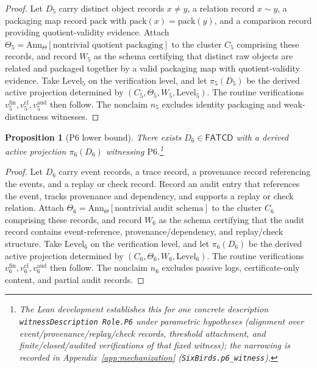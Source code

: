 \documentclass[11pt]{article}
\newtheorem{proposition}[theorem]{Proposition}
\theoremstyle{definition}
\newcommand{\FATCD}{\ensuremath{\mathsf{FATCD}}}
\newcommand{\Psix}{\ensuremath{\mathrm{P6}}}
\begin{document}
\begin{proof}
Let \(D_5\) carry distinct object records \(x \ne y\), a relation
record \(x \sim y\), a packaging map record
\(\mathrm{pack}\) with \(\mathrm{pack}(x) = \mathrm{pack}(y)\), and a
comparison record providing quotient-validity evidence. Attach
\(\Theta_5 = \mathrm{Ann}_\Theta[\text{nontrivial quotient packaging}]\)
to the cluster \(C_5\) comprising these records, and record \(W_5\) as
the schema certifying
that distinct raw objects are related and packaged together by a valid
packaging map with quotient-validity evidence. Take
\(\mathrm{Level}_5\) on the verification level, and let \(\pi_5(D_5)\)
be the derived active projection determined by
\((C_5,\Theta_5,W_5,\mathrm{Level}_5)\). The routine verifications
\(v_5^{\mathrm{fin}}, v_5^{\mathrm{cl}}, v_5^{\mathrm{aud}}\) then
follow. The nonclaim \(n_5\) excludes identity packaging and
weak-distinctness witnesses.
\end{proof}

\begin{proposition}[\Psix{} lower bound]\label{prop:p6-witness}
There exists \(D_6 \in \FATCD{}\) with a derived active projection
\(\pi_6(D_6)\) witnessing \Psix{}.\footnote{The Lean development establishes this for one concrete description \texttt{witnessDescription Role.P6} under parametric hypotheses (alignment over event/provenance/replay/check records, threshold attachment, and finite/closed/audited verifications of that fixed witness); the narrowing is recorded in Appendix~\ref{app:mechanization} (\texttt{SixBirds.p6\_witness}).}
\end{proposition}

\begin{proof}
Let \(D_6\) carry event records, a trace record, a provenance record
referencing the events, and a replay or check record. Record an audit
entry that references the event, tracks provenance and dependency, and
supports a replay or check relation. Attach
\(\Theta_6 = \mathrm{Ann}_\Theta[\text{nontrivial audit schema}]\) to
the cluster \(C_6\) comprising these records, and record \(W_6\) as the
schema certifying that
the audit record contains event-reference, provenance/dependency, and
replay/check structure. Take \(\mathrm{Level}_6\) on the verification
level, and let \(\pi_6(D_6)\) be the derived active projection
determined by \((C_6,\Theta_6,W_6,\mathrm{Level}_6)\). The routine
verifications \(v_6^{\mathrm{fin}}, v_6^{\mathrm{cl}},
v_6^{\mathrm{aud}}\) then follow. The nonclaim \(n_6\) excludes passive
logs, certificate-only content, and partial audit records.
\end{proof}
\end{document}
